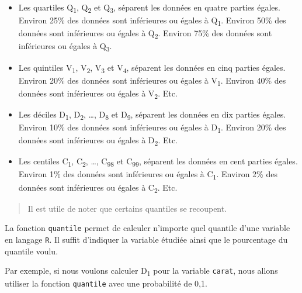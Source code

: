 \documentclass[]{book}
\newenvironment{Shaded}{\begin{snugshade}}{\end{snugshade}}
\newcommand{\FloatTok}[1]{\textcolor[rgb]{0.00,0.00,0.81}{#1}}
\newcommand{\KeywordTok}[1]{\textcolor[rgb]{0.13,0.29,0.53}{\textbf{#1}}}
\newcommand{\NormalTok}[1]{#1}
\newcommand{\OperatorTok}[1]{\textcolor[rgb]{0.81,0.36,0.00}{\textbf{#1}}}
\providecommand{\tightlist}{%
  \setlength{\itemsep}{0pt}\setlength{\parskip}{0pt}}
\theoremstyle{definition}
\theoremstyle{definition}
\theoremstyle{definition}
\theoremstyle{remark}
\begin{document}
\begin{itemize}
\tightlist
\item
  Les quartiles Q\textsubscript{1}, Q\textsubscript{2} et
  Q\textsubscript{3}, séparent les données en quatre parties égales.
  Environ 25\% des données sont inférieures ou égales à
  Q\textsubscript{1}. Environ 50\% des données sont inférieures ou
  égales à Q\textsubscript{2}. Environ 75\% des données sont inférieures
  ou égales à Q\textsubscript{3}.
\item
  Les quintiles V\textsubscript{1}, V\textsubscript{2},
  V\textsubscript{3} et V\textsubscript{4}, séparent les données en cinq
  parties égales. Environ 20\% des données sont inférieures ou égales à
  V\textsubscript{1}. Environ 40\% des données sont inférieures ou
  égales à V\textsubscript{2}. Etc.
\item
  Les déciles D\textsubscript{1}, D\textsubscript{2}, \ldots{},
  D\textsubscript{8} et D\textsubscript{9}, séparent les données en dix
  parties égales. Environ 10\% des données sont inférieures ou égales à
  D\textsubscript{1}. Environ 20\% des données sont inférieures ou
  égales à D\textsubscript{2}. Etc.
\item
  Les centiles C\textsubscript{1}, C\textsubscript{2}, \ldots{},
  C\textsubscript{98} et C\textsubscript{99}, séparent les données en
  cent parties égales. Environ 1\% des données sont inférieures ou
  égales à C\textsubscript{1}. Environ 2\% des données sont inférieures
  ou égales à C\textsubscript{2}. Etc.
\end{itemize}

\begin{quote}
Il est utile de noter que certains quantiles se recoupent.
\end{quote}

La fonction \texttt{quantile} permet de calculer n'importe quel quantile
d'une variable en langage \texttt{R}. Il suffit d'indiquer la variable
étudiée ainsi que le pourcentage du quantile voulu.

Par exemple, si nous voulons calculer D\textsubscript{1} pour la
variable \texttt{carat}, nous allons utiliser la fonction
\texttt{quantile} avec une probabilité de 0,1.

\begin{Shaded}
\end{Shaded}
\end{document}
